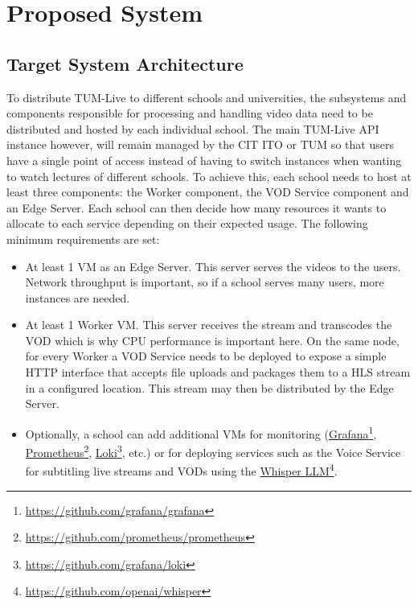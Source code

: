 \section{Proposed System}

\subsection{Target System Architecture}

To distribute TUM-Live to different schools and universities, the subsystems and components responsible for processing and handling video data need to be distributed and hosted by each individual school. 
The main TUM-Live \ac{API} instance however, will remain managed by the \ac{CIT} \ac{ITO} or \ac{TUM} so that users have a single point of access instead of having to switch instances when wanting to watch lectures of different schools.
To achieve this, each school needs to host at least three components: the Worker component, the VOD Service component and an Edge Server. 
Each school can then decide how many resources it wants to allocate to each service depending on their expected usage. The following minimum requirements are set:

\begin{itemize}
    \item At least 1 \ac{VM} as an Edge Server. This server serves the videos to the users. Network throughput is important, so if a school serves many users, more instances are needed.
    \item At least 1 Worker \ac{VM}. This server receives the stream and transcodes the \ac{VOD} which is why CPU performance is important here. On the same node, for every Worker a VOD Service needs to be deployed to expose a simple HTTP interface that accepts file uploads and packages them to a \ac{HLS} stream in a configured location. This stream may then be distributed by the Edge Server.
    \item Optionally, a school can add additional \ac{VM}s for monitoring (\href{https://github.com/grafana/grafana}{Grafana}\footnote{\url{https://github.com/grafana/grafana}}, \href{https://github.com/prometheus/prometheus}{Prometheus}\footnote{\url{https://github.com/prometheus/prometheus}}, \href{https://github.com/grafana/loki}{Loki}\footnote{\url{https://github.com/grafana/loki}}, etc.) or for deploying services such as the Voice Service for subtitling live streams and \ac{VOD}s using the \href{https://github.com/openai/whisper}{Whisper LLM}\footnote{\url{https://github.com/openai/whisper}}.
\end{itemize}


